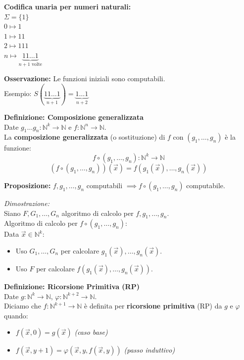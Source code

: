 \vspace{0.4cm}
\textbf{Codifica unaria per numeri naturali:} \\
$\Sigma = \{1\}$ \\
$0 \mapsto 1$ \\
$1 \mapsto 11$ \\
$2 \mapsto 111$ \\
$n \mapsto \underbrace{11\dots1}_{n+1 \text{ volte}}$

\vspace{0.4cm}
\textbf{Osservazione:} Le funzioni iniziali sono computabili. \\
Esempio: $S(\underbrace{11\dots1}_{n+1}) = \underbrace{1\dots1}_{n+2}$

\vspace{0.4cm}
\textbf{Definizione: Composizione generalizzata} \\
Date $g_1 \dots g_n : \mathbb{N}^k \to \mathbb{N}$ e $f : \mathbb{N}^n \to \mathbb{N}$. \\
La \textbf{composizione generalizzata} (o sostituzione) di $f$ con $(g_1, \dots, g_n)$ è la funzione:
$$f \circ (g_1, \dots, g_n) : \mathbb{N}^k \to \mathbb{N}$$
$$(f \circ (g_1, \dots, g_n))(\vec{x}) = f(g_1(\vec{x}), \dots, g_n(\vec{x}))$$

\vspace{0.4cm}
\textbf{Proposizione:} $f, g_1, \dots, g_n$ computabili $\implies f \circ (g_1, \dots, g_n)$ computabile.

\textit{Dimostrazione:} \\
Siano $F, G_1, \dots, G_n$ algoritmo di calcolo per $f, g_1, \dots, g_n$. \\
Algoritmo di calcolo per $f \circ (g_1, \dots, g_n)$: \\
Data $\vec{x} \in \mathbb{N}^k$:
\begin{itemize}
    \item Uso $G_1, \dots, G_n$ per calcolare $g_1(\vec{x}), \dots, g_n(\vec{x})$.
    \item Uso $F$ per calcolare $f(g_1(\vec{x}), \dots, g_n(\vec{x}))$.
\end{itemize}

\vspace{0.4cm}
\textbf{Definizione: Ricorsione Primitiva (RP)} \\
Date $g: \mathbb{N}^k \to \mathbb{N}$, $\varphi : \mathbb{N}^{k+2} \to \mathbb{N}$. \\
Diciamo che $f: \mathbb{N}^{k+1} \to \mathbb{N}$ è definita per \textbf{ricorsione primitiva} (RP) da $g$ e $\varphi$ quando:
\begin{itemize}
    \item $f(\vec{x}, 0) = g(\vec{x})$  \textit{(caso base)}
    \item $f(\vec{x}, y+1) = \varphi(\vec{x}, y, f(\vec{x}, y))$ \textit{(passo induttivo)}
\end{itemize}

